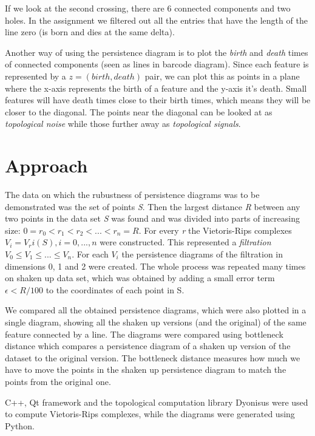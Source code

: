 \documentclass[11pt]{article}
\begin{document}
If we look at the second crossing, there are 6 connected components and two holes. In the assignment we filtered out all the entries that have the length of the line zero (is born and dies at the same delta).

Another way of using the persistence diagram is to plot the \emph{birth} and \emph{death} times of connected components (seen as lines in barcode diagram). Since each feature is represented by a $z = (birth, death)$ pair, we can plot this as points in a plane where the x-axis represents the birth of a feature and the y-axis it's death. Small features will have death times close to their birth times, which means they will be closer to the diagonal. The points near the diagonal can be looked at as \emph{topological noise} while those further away as \emph{topological signals}.


\section{Approach}

The data on which the rubustness of persistence diagrams was to be demonstrated was the set of points \emph{S}. Then the largest distance \emph{R} between any two points in the data set \emph{S} was found and was divided into parts of increasing size: $0 = r_0 < r_1 < r_2 < ... < r_n = R$. For every \emph{r} the Vietoris-Rips complexes $V_i = V_ri(S), i = 0,...,n$ were constructed. This represented a \emph{filtration} $V_0 \leq V_1 \leq ... \leq V_n$. For each \emph{$V_i$} the persistence diagrams of the filtration in dimensions 0, 1 and 2 were created. The whole process was repeated many times on shaken up data set, which was obtained by adding a small error term $\epsilon < R/100$ to the coordinates of each point in S.

We compared all the obtained persistence diagrams, which were also plotted in a single diagram, showing all the shaken up versions (and the original) of the same feature connected by a line. The diagrams were compared using bottleneck distance which compares a persistence diagram of a shaken up version of the dataset to the original version. The bottleneck distance measures how much we have to move the points in the shaken up persistence diagram to match the points from the original one.


C++, Qt framework and the topological computation library Dyonisus were used to compute Vietoris-Rips complexes, while the diagrams were generated using Python.
\end{document}
